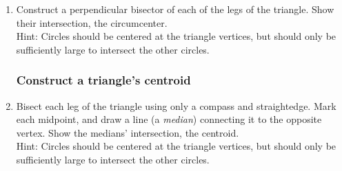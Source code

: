 \documentclass[12pt, oneside]{article}
\begin{document}
\begin{enumerate}
  \item Construct a perpendicular bisector of each of the legs of the triangle. Show their intersection, the circumcenter.\\[0.2cm]
  Hint: Circles should be centered at the triangle vertices, but should only be sufficiently large to intersect the other circles.
      \vspace{3cm}
      \begin{center}
      \end{center}

  \newpage
  \subsubsection*{Construct a triangle's centroid}

    \item Bisect each leg of the triangle using only a compass and straightedge. Mark each midpoint, and draw a line (a \emph{median}) connecting it to the opposite vertex. Show the medians' intersection, the centroid.\\[0.2cm]
    Hint: Circles should be centered at the triangle vertices, but should only be sufficiently large to intersect the other circles.
        \vspace{3cm}
        \begin{center}
        \end{center}

\end{enumerate}
\end{document}
